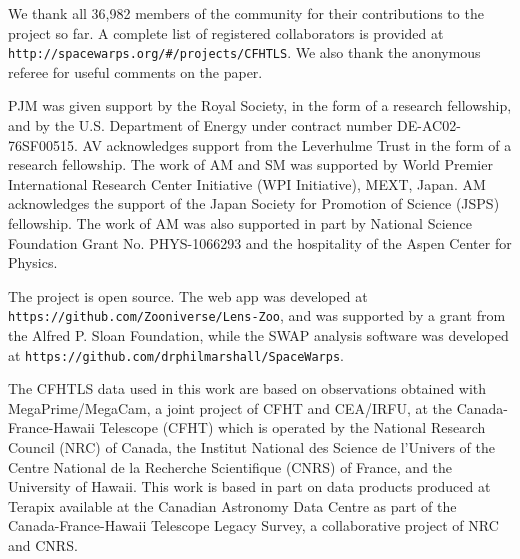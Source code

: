 We thank all 36,982 members of the \sw community for their
contributions to the project so far. A complete list of registered
collaborators is provided at \texttt{http://spacewarps.org/\#/projects/CFHTLS}.
We also thank the anonymous referee for useful comments on the paper.

PJM was given support by the Royal Society, in the form of a research
fellowship, and by the U.S. Department of Energy under contract number DE-AC02-76SF00515.
%
AV acknowledges support from the Leverhulme Trust in the form of a research
fellowship.
%
The work of AM and SM was supported by World Premier International Research
Center Initiative (WPI Initiative), MEXT, Japan. AM acknowledges the support of
the Japan Society for Promotion of Science (JSPS) fellowship. The work of AM
was also supported in part by National Science Foundation Grant No.
PHYS-1066293 and the hospitality of the Aspen Center for Physics. 
%
%

The \sw project is open source.
The web app was developed at \texttt{https://github.com/Zooniverse/Lens-Zoo}, and was supported by a grant from the Alfred P. Sloan Foundation, 
while the SWAP analysis software was developed at
\texttt{https://github.com/drphilmarshall/SpaceWarps}.

The CFHTLS data used in this work are based on observations obtained with
MegaPrime/MegaCam, a joint project of CFHT and CEA/IRFU, at the
Canada-France-Hawaii Telescope (CFHT) which is operated by the National Research
Council (NRC) of Canada, the Institut National des Science de l'Univers of the
Centre National de la Recherche Scientifique (CNRS) of France, and the
University of Hawaii. This work is based in part on data products produced at
Terapix available at the Canadian Astronomy Data Centre as part of the
Canada-France-Hawaii Telescope Legacy Survey, a collaborative project of NRC and
CNRS.
